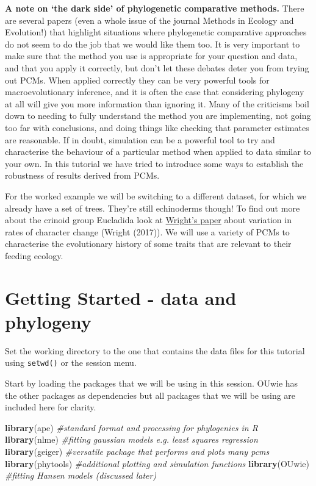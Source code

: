 \documentclass[]{article}
\newenvironment{Shaded}{\begin{snugshade}}{\end{snugshade}}
\newcommand{\KeywordTok}[1]{\textcolor[rgb]{0.13,0.29,0.53}{\textbf{#1}}}
\newcommand{\CommentTok}[1]{\textcolor[rgb]{0.56,0.35,0.01}{\textit{#1}}}
\newcommand{\NormalTok}[1]{#1}
\begin{document}
\textbf{A note on `the dark side' of phylogenetic comparative methods.}
There are several papers (even a whole issue of the journal Methods in
Ecology and Evolution!) that highlight situations where phylogenetic
comparative approaches do not seem to do the job that we would like them
too. It is very important to make sure that the method you use is
appropriate for your question and data, and that you apply it correctly,
but don't let these debates deter you from trying out PCMs. When applied
correctly they can be very powerful tools for macroevolutionary
inference, and it is often the case that considering phylogeny at all
will give you more information than ignoring it. Many of the criticisms
boil down to needing to fully understand the method you are
implementing, not going too far with conclusions, and doing things like
checking that parameter estimates are reasonable. If in doubt,
simulation can be a powerful tool to try and characterise the behaviour
of a particular method when applied to data similar to your own. In this
tutorial we have tried to introduce some ways to establish the
robustness of results derived from PCMs.

For the worked example we will be switching to a different dataset, for
which we already have a set of trees. They're still echinoderms though!
To find out more about the crinoid group Eucladida look at
\href{https://www.nature.com/articles/s41598-017-13979-9}{Wright's
paper} about variation in rates of character change (Wright (2017)). We
will use a variety of PCMs to characterise the evolutionary history of
some traits that are relevant to their feeding ecology.

\section{Getting Started - data and
phylogeny}\label{getting-started---data-and-phylogeny}

Set the working directory to the one that contains the data files for
this tutorial using \texttt{setwd()} or the session menu.

Start by loading the packages that we will be using in this session.
OUwie has the other packages as dependencies but all packages that we
will be using are included here for clarity.

\begin{Shaded}
\begin{Highlighting}[]
\KeywordTok{library}\NormalTok{(ape) }\CommentTok{#standard format and processing for phylogenies in R}
\KeywordTok{library}\NormalTok{(nlme) }\CommentTok{#fitting gaussian models e.g. least squares regression}
\KeywordTok{library}\NormalTok{(geiger) }\CommentTok{#versatile package that performs and plots many pcms}
\KeywordTok{library}\NormalTok{(phytools) }\CommentTok{#additional plotting and simulation functions}
\KeywordTok{library}\NormalTok{(OUwie) }\CommentTok{#fitting Hansen models (discussed later)}
\end{Highlighting}
\end{Shaded}
\end{document}
